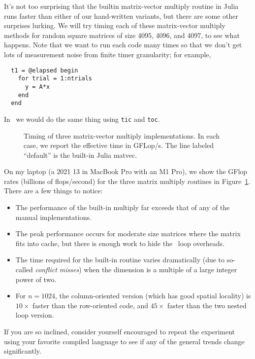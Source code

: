 \documentclass[12pt, leqno]{article}
\begin{document}
It's not too surprising that the builtin matrix-vector multiply routine in
Julia runs faster than either of our hand-written variants, but there
are some other surprises lurking.  We will try timing each of these
matrix-vector multiply methods for random square matrices of
size 4095, 4096, and 4097, to see what happens.  Note that we want to
run each code many times so that we don't get lots of measurement
noise from finite timer granularity; for example,
\begin{lstlisting}
  t1 = @elapsed begin
    for trial = 1:ntrials
      y = A*x
    end
  end  
\end{lstlisting}
In \matlab\ we would do the same thing using {\tt tic} and {\tt toc}.

\begin{figure} \label{fig:matvec-time}
  \caption{Timing of three matrix-vector multiply implementations.
    In each case, we report the effective time in GFLop/s.
    The line labeled ``default'' is the built-in Julia matvec.}
\end{figure}

On my laptop (a 2021 13 in MacBook Pro with an M1 Pro),
we show the GFlop rates (billions of flops/second)
for the three matrix multiply routines in Figure~\ref{fig:matvec-time}.
There are a few things to notice:
\begin{itemize}
\item The performance of the built-in multiply far exceeds that
  of any of the manual implementations.
\item The peak performance occurs for moderate size matrices where
  the matrix fits into cache, but there is enough work to hide
  the \matlab\ loop overheads.
\item The time required for the built-in routine varies dramatically
  (due to so-called {\em conflict misses}) when the dimension is
  a multiple of a large integer power of two.
\item For $n = 1024$, the column-oriented version (which has good spatial
  locality) is $10\times$ faster than the row-oriented code,
  and $45\times$ faster than the two nested loop version.
\end{itemize}
If you are so inclined, consider yourself encouraged to repeat the
experiment using your favorite compiled language to see if any of the
general trends change significantly.
\end{document}
